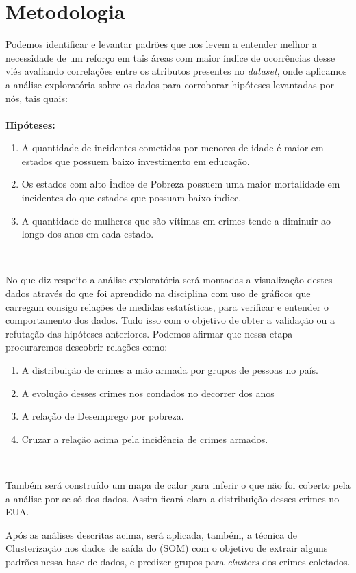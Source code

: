 \section{
Metodologia} 
\par
Podemos identificar e levantar padrões que nos levem a entender melhor a necessidade de um reforço em tais áreas com maior índice de ocorrências desse viés avaliando correlações entre os atributos presentes no \textit{dataset}, onde aplicamos a análise exploratória sobre os dados para corroborar hipóteses levantadas por nós, tais quais:
\\
\\

\textbf{Hipóteses:}

\begin{enumerate}
\item A quantidade de incidentes cometidos por menores de idade é maior em estados que possuem baixo investimento em educação.
\item Os estados com alto Índice de Pobreza possuem uma maior mortalidade em incidentes do que estados que possuam baixo índice.
\item A quantidade de mulheres que são vítimas em crimes tende a diminuir ao longo dos anos em cada estado.
\end{enumerate}
\\

\par
No que diz respeito a análise exploratória será montadas a visualização destes dados  através do que foi aprendido na disciplina com uso de gráficos que carregam consigo relações de medidas estatísticas, para verificar e entender o comportamento dos dados.  Tudo isso com o objetivo de obter a validação ou a refutação das hipóteses anteriores. Podemos afirmar que nessa etapa procuraremos descobrir relações como:
\\
\begin{enumerate}
\item A distribuição de crimes a mão armada por grupos de pessoas no país.
\item A evolução desses crimes nos condados no decorrer dos anos 
\item A relação de Desemprego por pobreza.
\item Cruzar a relação acima pela incidência de crimes armados.
\end{enumerate}
\\
\par
Também será construído um mapa de calor para inferir o que não foi coberto pela a análise por se só dos dados. Assim ficará clara a distribuição desses crimes no EUA.    
\par
Após as análises descritas acima, será aplicada, também, a técnica de Clusterização nos dados de saída do (SOM) com o objetivo de extrair alguns padrões nessa base de dados, e predizer grupos para \textit{clusters} dos crimes coletados.
